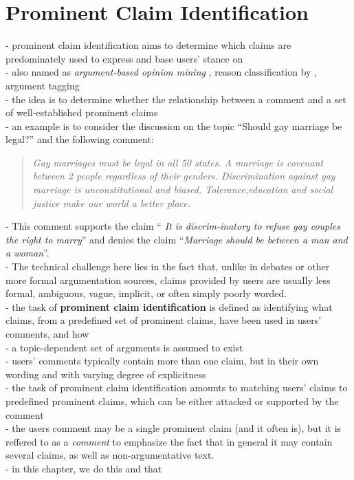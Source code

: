 \chapter{Prominent Claim Identification}
\label{chap:argrec}

- prominent claim identification aims to determine 
which claims are predominately used to express and base
users' stance on \\
- also named as \textit{argument-based opinion mining} \citep{boltuzic2014back}, 
reason classification by \citep{hasan2014you}, argument tagging 
\citep{sobhani2015argumentation} \\
- the idea is to determine whether the relationship between a comment and a set
of well-established prominent claims \\
- an example is to consider the discussion on the topic ``Should gay marriage be legal?''
and the following comment:
\begin{quote}
\emph{
Gay marriages must be legal in all 50 states. A marriage is covenant
between 2 people regardless of their genders. Discrimination against
gay marriage is unconstitutional and biased. Tolerance,education and
social justice make our world a better place.
}
\end{quote}
- This comment supports the claim ``
\textit{It is discrim-inatory to refuse gay couples
the right to marry}''
and denies the claim ``\textit{Marriage should be between a man
and a woman}''. \\
- The technical challenge here lies in the fact that, unlike in
debates or other more formal argumentation sources, claims provided by 
users are usually less formal, ambiguous, vague, implicit, or often
simply poorly worded. \\
- the task of \textbf{prominent claim identification} is defined
as identifying what claims, from  a  predefined  set  of  prominent claims, have
been used in users' comments, and how \\
- a topic-dependent set of arguments is assumed to exist \\
- users' comments typically contain more than one claim, but in 
their own wording and with varying degree of explicitness \\
- the task of prominent claim identification amounts to 
matching users' claims to predefined prominent claims, which 
can be either attacked or supported by the comment \\
- the users comment may be a single prominent claim
(and it often is), but it is reffered to as a \textit{comment}
to emphasize the fact that in general it may contain several claims, 
as well as non-argumentative text. \\
- in this chapter, we do this and that \\

